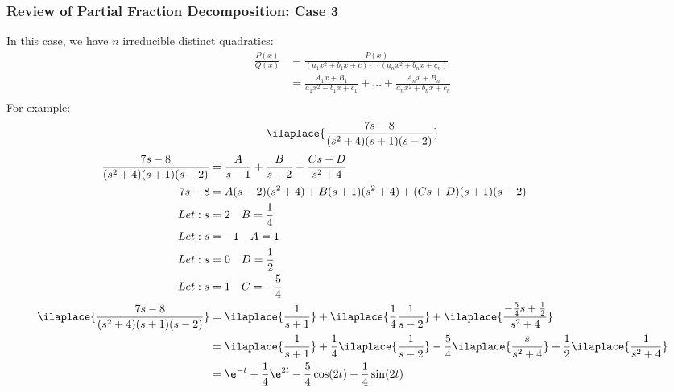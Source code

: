 \documentclass{math}
\begin{document}
\subsubsection*{Review of Partial Fraction Decomposition: Case 3}
In this case, we have \( n \) irreducible distinct quadratics:
\begin{align*}
  \frac{P(x)}{Q(x)} &=
    \frac{P(x)}{(a_1x^2+b_1x+c)\cdot\cdot\cdot(a_nx^2+b_nx+c_n)} \\
  &= \frac{A_1x+B_1}{a_1x^2+b_1x+c_1}+\dots+\frac{A_nx+B_n}{a_nx^2+b_nx+c_n} \\
\end{align*}
For example:
\[ \ilaplace{\frac{7s-8}{(s^2+4)(s+1)(s-2)}} \]
\begin{align*}
  \frac{7s-8}{(s^2+4)(s+1)(s-2)} &=
    \frac{A}{s-1}+\frac{B}{s-2}+\frac{Cs+D}{s^2+4} \\
  7s-8 &= A(s-2)(s^2+4)+B(s+1)(s^2+4)+(Cs+D)(s+1)(s-2) \\
  Let: s &= 2 \quad B = \frac{1}{4} \\
  Let: s &= -1 \quad A = 1 \\
  Let: s &= 0 \quad D = \frac{1}{2} \\
  Let: s &= 1 \quad C = -\frac{5}{4} \\
  \ilaplace{\frac{7s-8}{(s^2+4)(s+1)(s-2)}} &= \ilaplace{\frac{1}{s+1}}+
    \ilaplace{\frac{1}{4}\frac{1}{s-2}}+
    \ilaplace{\frac{-\frac{5}{4}s+\frac{1}{2}}{s^2+4}} \\
  &= \ilaplace{\frac{1}{s+1}}+\frac{1}{4}\ilaplace{\frac{1}{s-2}}-
    \frac{5}{4}\ilaplace{\frac{s}{s^2+4}}+
    \frac{1}{2}\ilaplace{\frac{1}{s^2+4}} \\
  &= \e^{-t}+\frac{1}{4}\e^{2t}-\frac{5}{4}\cos(2t)+\frac{1}{4}\sin(2t)
\end{align*}
\end{document}
